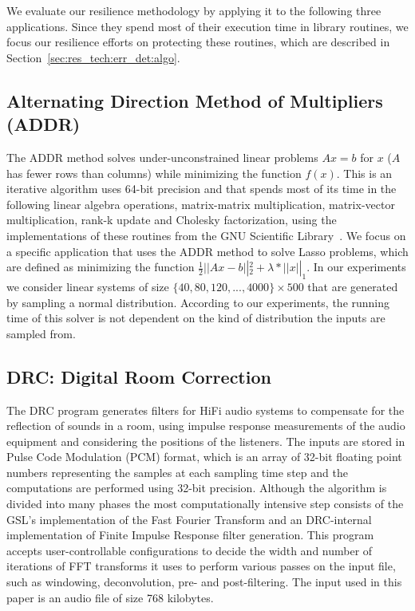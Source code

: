 \documentclass{sig-alternate}
\newcommand{\greg}[1]{%
  \textcolor{blue}{GB: #1}
}
\begin{document}
We evaluate our resilience methodology by applying it to the following three applications.
Since they spend most of their execution time in library routines, we focus our resilience efforts on protecting these routines, which are described in Section~\ref{sec:res_tech:err_det:algo}.


\subsection{Alternating Direction Method of Multipliers (ADDR)}
\label{sec:apps:lasso}
The ADDR method solves under-unconstrained linear problems $Ax=b$ for $x$ ($A$ has fewer rows than columns) while minimizing the function $f(x)$.
This is an iterative algorithm uses 64-bit precision and that spends most of its time in the following linear algebra operations, matrix-matrix multiplication, matrix-vector multiplication, rank-k update and Cholesky factorization, using the implementations of these routines from the GNU Scientific Library~\cite{gsl:2011}.
We focus on a specific application that uses the ADDR method to solve Lasso problems, which are defined as minimizing the function $\frac{1}{2} \left|| Ax - b \right||_2^2 + \lambda*\left|| x \right||_1$.
In our experiments we consider linear systems of size $\{40, 80, 120, ..., 4000\} \times 500$ that are generated by sampling a normal distribution.
According to our experiments, the running time of this solver is not dependent on the kind of distribution the inputs are sampled from.

\subsection{DRC: Digital Room Correction}
\label{sec:apps:drc}

The DRC program generates filters for HiFi audio systems to compensate for the reflection of sounds in a room, using impulse response measurements of the audio equipment and considering the positions of the listeners.
The inputs are stored in Pulse Code Modulation (PCM) format, which is an array of 32-bit floating point numbers representing the samples at each sampling time step and the computations are performed using 32-bit precision.
Although the algorithm is divided into many phases the most computationally intensive step consists of the GSL's implementation of the Fast Fourier Transform and an DRC-internal implementation of Finite Impulse Response filter generation.
This program accepts user-controllable configurations to decide the width and number of iterations of FFT transforms it uses to perform various passes on the input file, such as windowing, deconvolution, pre- and post-filtering.
The input used in this paper is an audio file of size 768 kilobytes.
\end{document}
